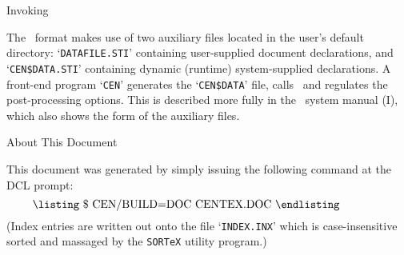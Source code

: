 \subhead
Invoking \cenTeX\

The \cen\ format makes use of two auxiliary files located in the user's 
default
directory: `{\tt DATA\-FILE.STI}' containing user-supplied document
declarations, and `{\tt CEN\$DATA.STI}' containing dynamic (runtime) 
system-supplied declarations. A front-end program `{\tt CEN}'  generates 
the
`{\tt CEN\$DATA}' file, calls \cen\ and regulates the post-processing 
options.
This is described more fully in the \cendoc\  system manual (I), which also
shows the form of the auxiliary files.

\subhead
About This Document

This document was generated by simply issuing the following
command at the DCL prompt:
$$
\vbox{\listing
\$ CEN/BUILD=DOC CENTEX.DOC
\endlisting}
$$
(Index entries are written out onto the file `{\tt INDEX.INX}' which is 
case-insensitive sorted and massaged by the {\tt SOR\TeX} utility 
program.) 
 
\noprivatize
 
